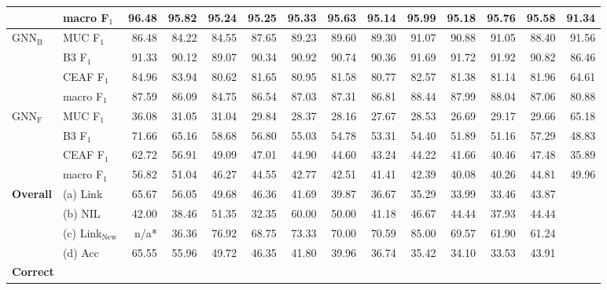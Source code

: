 \begin{landscape}
\begin{table}
\begin{tabular}{llrrrrrrrrrrrr}
& macro F$_1$       &  \textbf{96.48} &  \textbf{95.82} &  \textbf{95.24} &  \textbf{95.25} &  \textbf{95.33} &  \textbf{95.63} &  \textbf{95.14} &  \textbf{95.99} &  \textbf{95.18} &  \textbf{95.76} &  \textbf{95.58} & \textbf{91.34} \\
\hline
$\text{GNN}_\text{B}$ & MUC F$_1$       &  86.48 &  84.22 &  84.55 &  87.65 &  89.23 &  89.60 &  89.30 &  91.07 &  90.88 &  91.05 &  88.40 & 91.56 \\
& B3 F$_1$        &  91.33 &  90.12 &  89.07 &  90.34 &  90.92 &  90.74 &  90.36 &  91.69 &  91.72 &  91.92 &  90.82 & 86.46 \\
& CEAF F$_1$      &  84.96 &  83.94 &  80.62 &  81.65 &  80.95 &  81.58 &  80.77 &  82.57 &  81.38 &  81.14 & 81.96  & 64.61  \\
& macro F$_1$ &  87.59 &  86.09 &  84.75 &  86.54 &  87.03 &  87.31 &  86.81 &  88.44 &  87.99 &  88.04 &  87.06 & 80.88 \\
\hline
$\text{GNN}_\text{F}$ & MUC F$_1$       &  36.08 &  31.05 &  31.04 &  29.84 &  28.37 &  28.16 &  27.67 &  28.53 &  26.69 &  29.17 &  29.66 &  65.18 \\
& B3 F$_1$        &  71.66 &  65.16 &  58.68 &  56.80 &  55.03 &  54.78 &  53.31 &  54.40 &  51.89 &  51.16 &  57.29 & 48.83 \\
& CEAF F$_1$      &  62.72 &  56.91 &  49.09 &  47.01 &  44.90 &  44.60 &  43.24 &  44.22 &  41.66 &  40.46 &  47.48 & 35.89 \\
& macro F$_1$ &  56.82 &  51.04 &  46.27 &  44.55 &  42.77 &  42.51 &  41.41 &  42.39 &  40.08 &  40.26 &  44.81 & 49.96 \\
\hline
\textbf{Overall} & (a) Link     &  65.67 &  56.05 &  49.68 &  46.36 &  41.69 &  39.87 &  36.67 &  35.29 &  33.99 &  33.46 &  43.87 & \\
& (b) NIL      &  42.00 &  38.46 &  51.35 &  32.35 &  60.00 &  50.00 &  41.18 &  46.67 &  44.44 &  37.93 &  44.44 & \\
& (c) Link$_{\text{New}}$ &   n/a* &  36.36 &  76.92 &  68.75 &  73.33 &  70.00 &  70.59 &  85.00 &  69.57 &  61.90 &  61.24 & \\ %
& (d) Acc &  65.55 &  55.96 &  49.72 &  46.35 &  41.80 &  39.96 &  36.74 &  35.42 &  34.10 &  33.53 &  43.91 & \\
\midrule
\hline
\multicolumn{14}{l}{\textbf{Correct}} \\

\end{tabular}
\end{table}
\end{landscape}
